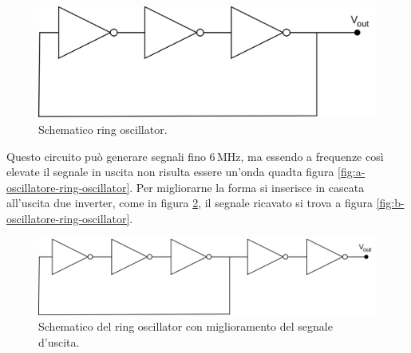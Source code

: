 \documentclass[a4paper,12pt]{article}
\begin{document}
\begin{figure}[h]
	\centering
	\includegraphics[width=0.6\linewidth]{immagini/ring-oscillator/ring-oscillator-schematico.png}
	\caption{Schematico ring oscillator.}
	\label{fig:ring-oscillator-schematico}
\end{figure}

Questo circuito può generare segnali fino $6\,\mathrm{MHz}$, ma essendo a frequenze così elevate il segnale in uscita non risulta essere un'onda quadta figura \ref{fig:a-oscillatore-ring-oscillator}. Per migliorarne la forma si inserisce in cascata all'uscita due inverter, come in figura \ref{fig:ring-oscillator-schematico-miglirato}, il segnale ricavato si trova a figura \ref{fig:b-oscillatore-ring-oscillator}.

\begin{figure}[h]
	\centering
	\includegraphics[width=0.7\linewidth]{immagini/ring-oscillator/3InverterNoRes.png}
	\caption{Schematico del ring oscillator con miglioramento del segnale d'uscita.}
	\label{fig:ring-oscillator-schematico-miglirato}
\end{figure}
\end{document}
